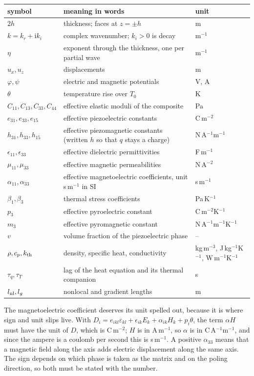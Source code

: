 \documentclass[11pt]{article}
\newcommand{\ii}{\mathrm{i}}
\begin{document}
\begin{center}
\small
\begin{tabular}{p{2.2cm}p{7.8cm}p{4.0cm}}
\toprule
symbol & meaning in words & unit\\
\midrule
$2h$ & thickness; faces at $z=\pm h$ & m\\
$k=k_r+\ii k_i$ & complex wavenumber; $k_i>0$ is decay & m$^{-1}$\\
$\eta$ & exponent through the thickness, one per partial wave & m$^{-1}$\\
$u_x,u_z$ & displacements & m\\
$\varphi,\psi$ & electric and magnetic potentials & V, A\\
$\theta$ & temperature rise over $T_0$ & K\\
$C_{11},C_{13},C_{33},C_{44}$ & effective elastic moduli of the composite & Pa\\
$e_{31},e_{33},e_{15}$ & effective piezoelectric constants & C\,m$^{-2}$\\
$h_{31},h_{33},h_{15}$ & effective piezomagnetic constants (written $h$ so that $q$ stays a charge) & N\,A$^{-1}$m$^{-1}$\\
$\epsilon_{11},\epsilon_{33}$ & effective dielectric permittivities & F\,m$^{-1}$\\
$\mu_{11},\mu_{33}$ & effective magnetic permeabilities & N\,A$^{-2}$\\
$\alpha_{11},\alpha_{33}$ & effective magnetoelectric coefficients, unit s\,m$^{-1}$ in SI & s\,m$^{-1}$\\
$\beta_1,\beta_3$ & thermal stress coefficients & Pa\,K$^{-1}$\\
$p_3$ & effective pyroelectric constant & C\,m$^{-2}$K$^{-1}$\\
$m_3$ & effective pyromagnetic constant & N\,A$^{-1}$m$^{-1}$K$^{-1}$\\
$v$ & volume fraction of the piezoelectric phase & --\\
$\rho,c_p,k_{\rm th}$ & density, specific heat, conductivity & kg\,m$^{-3}$, J\,kg$^{-1}$K$^{-1}$, W\,m$^{-1}$K$^{-1}$\\
$\tau_q,\tau_T$ & lag of the heat equation and its thermal companion & s\\
$l_{\rm nl},l_g$ & nonlocal and gradient lengths & m\\
\bottomrule
\end{tabular}
\end{center}

The magnetoelectric coefficient deserves its unit spelled out, because it is where sign and unit slips live. With $D_i=e_{ikl}\varepsilon_{kl}+\epsilon_{ik}E_k+\alpha_{ik}H_k+p_i\theta$, the term
$\alpha H$ must have the unit of $D$, which is C\,m$^{-2}$; $H$ is in A\,m$^{-1}$, so $\alpha$ is in
C\,A$^{-1}$m$^{-1}$, and since the ampere is a coulomb per second this is s\,m$^{-1}$. A positive
$\alpha_{33}$ means that a magnetic field along the axis adds electric displacement along the same axis.
The sign depends on which phase is taken as the matrix and on the poling direction, so both must be stated
with the number.
\end{document}
